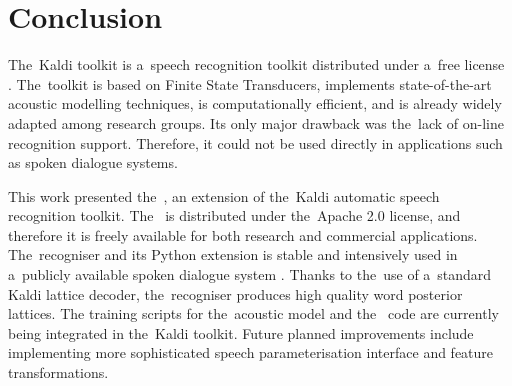 \chapter{Conclusion}
\label{cha:conclusion}


The~Kaldi toolkit is a~speech recognition toolkit distributed under a~free license \cite{povey2011kaldi}.
The~toolkit is based on Finite State Transducers, implements state-of-the-art acoustic modelling techniques, is computationally efficient, and is already widely adapted among research groups.
Its only major drawback was the~lack of on-line recognition support.
Therefore, it could not be used directly in applications such as spoken dialogue systems.

This work presented the~, an extension of the~Kaldi automatic speech recognition toolkit.
The~ is distributed under the~Apache 2.0 license, and therefore it is freely available for both research and commercial applications.
The~recogniser and its Python extension is stable and intensively used in a~publicly available spoken dialogue system \cite{ptics2014url}.
Thanks to the~use of a~standard Kaldi lattice decoder, the~recogniser produces high quality word posterior lattices.
The training scripts for the~acoustic model and the~ code are currently being integrated in the~Kaldi toolkit.
Future planned improvements include implementing more sophisticated speech parameterisation interface and feature transformations.

